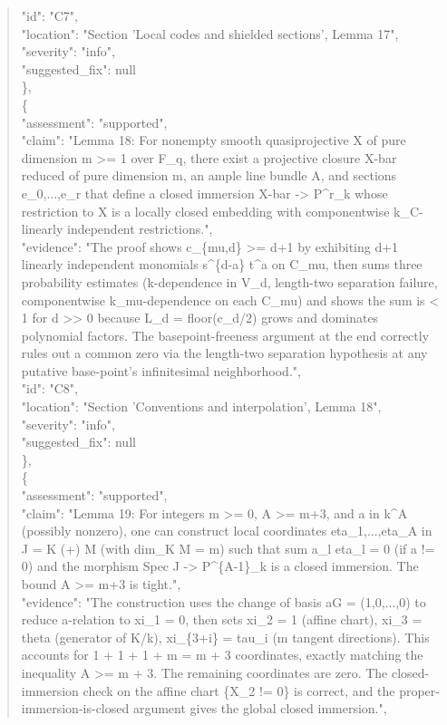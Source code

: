 \documentclass[11pt]{article}
\begin{document}
\begin{quote}
      "id": "C7",\\
      "location": "Section 'Local codes and shielded sections', Lemma 17",\\
      "severity": "info",\\
      "suggested\_fix": null\\
    \},\\
    \{\\
      "assessment": "supported",\\
      "claim": "Lemma 18: For nonempty smooth quasiprojective X of pure dimension m >= 1 over F\_q, there exist a projective closure X-bar reduced of pure dimension m, an ample line bundle A, and sections e\_0,...,e\_r that define a closed immersion X-bar -> P\^{}r\_k whose restriction to X is a locally closed embedding with componentwise k\_C-linearly independent restrictions.",\\
      "evidence": "The proof shows c\_\{mu,d\} >= d+1 by exhibiting d+1 linearly independent monomials s\^{}\{d-a\} t\^{}a on C\_mu, then sums three probability estimates (k-dependence in V\_d, length-two separation failure, componentwise k\_mu-dependence on each C\_mu) and shows the sum is < 1 for d >> 0 because L\_d = floor(c\_d/2) grows and dominates polynomial factors. The basepoint-freeness argument at the end correctly rules out a common zero via the length-two separation hypothesis at any putative base-point's infinitesimal neighborhood.",\\
      "id": "C8",\\
      "location": "Section 'Conventions and interpolation', Lemma 18",\\
      "severity": "info",\\
      "suggested\_fix": null\\
    \},\\
    \{\\
      "assessment": "supported",\\
      "claim": "Lemma 19: For integers m >= 0, A >= m+3, and a in k\^{}A (possibly nonzero), one can construct local coordinates eta\_1,...,eta\_A in J = K (+) M (with dim\_K M = m) such that sum a\_l eta\_l = 0 (if a != 0) and the morphism Spec J -> P\^{}\{A-1\}\_k is a closed immersion. The bound A >= m+3 is tight.",\\
      "evidence": "The construction uses the change of basis aG = (1,0,...,0) to reduce a-relation to xi\_1 = 0, then sets xi\_2 = 1 (affine chart), xi\_3 = theta (generator of K/k), xi\_\{3+i\} = tau\_i (m tangent directions). This accounts for 1 + 1 + 1 + m = m + 3 coordinates, exactly matching the inequality A >= m + 3. The remaining coordinates are zero. The closed-immersion check on the affine chart \{X\_2 != 0\} is correct, and the proper-immersion-is-closed argument gives the global closed immersion.",\\

\end{quote}
\end{document}
